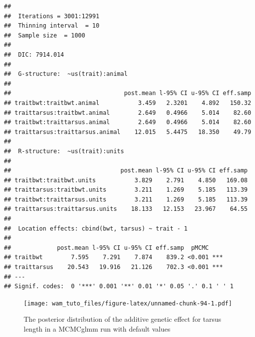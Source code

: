 \documentclass[
  12pt,
]{book}
\newenvironment{Shaded}{\begin{snugshade}}{\end{snugshade}}
\newcommand{\DecValTok}[1]{\textcolor[rgb]{0.00,0.00,0.81}{#1}}
\newcommand{\FloatTok}[1]{\textcolor[rgb]{0.00,0.00,0.81}{#1}}
\newcommand{\FunctionTok}[1]{\textcolor[rgb]{0.00,0.00,0.00}{#1}}
\newcommand{\NormalTok}[1]{#1}
\newcommand{\SpecialCharTok}[1]{\textcolor[rgb]{0.00,0.00,0.00}{#1}}
\newcommand{\StringTok}[1]{\textcolor[rgb]{0.31,0.60,0.02}{#1}}
\begin{document}
\begin{verbatim}
## 
##  Iterations = 3001:12991
##  Thinning interval  = 10
##  Sample size  = 1000 
## 
##  DIC: 7914.014 
## 
##  G-structure:  ~us(trait):animal
## 
##                                post.mean l-95% CI u-95% CI eff.samp
## traitbwt:traitbwt.animal           3.459   2.3201    4.892   150.32
## traittarsus:traitbwt.animal        2.649   0.4966    5.014    82.60
## traitbwt:traittarsus.animal        2.649   0.4966    5.014    82.60
## traittarsus:traittarsus.animal    12.015   5.4475   18.350    49.79
## 
##  R-structure:  ~us(trait):units
## 
##                               post.mean l-95% CI u-95% CI eff.samp
## traitbwt:traitbwt.units           3.829    2.791    4.850   169.08
## traittarsus:traitbwt.units        3.211    1.269    5.185   113.39
## traitbwt:traittarsus.units        3.211    1.269    5.185   113.39
## traittarsus:traittarsus.units    18.133   12.153   23.967    64.55
## 
##  Location effects: cbind(bwt, tarsus) ~ trait - 1 
## 
##             post.mean l-95% CI u-95% CI eff.samp  pMCMC    
## traitbwt        7.595    7.291    7.874    839.2 <0.001 ***
## traittarsus    20.543   19.916   21.126    702.3 <0.001 ***
## ---
## Signif. codes:  0 '***' 0.001 '**' 0.01 '*' 0.05 '.' 0.1 ' ' 1
\end{verbatim}

\begin{Shaded}
\end{Shaded}

\begin{figure}
\centering
\texttt{[image: wam\_tuto\_files/figure-latex/unnamed-chunk-94-1.pdf]}
\caption{\label{fig:unnamed-chunk-94}The posterior distribution of the additive genetic effect for tarsus length in a MCMCglmm run with default values}
\end{figure}

\begin{Shaded}
\end{Shaded}
\end{document}
